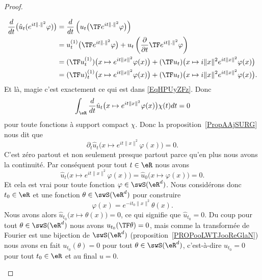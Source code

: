 \begin{proof}
\begin{subproof}
        \begin{subequations}    \label{EqCRGfbLU}
            \begin{align}
            \frac{ d }{ dt }\big( \hat u_t( e^{it\| . \|^2}\varphi) \big)&=\frac{ d }{ dt }\left( u_t\big( \TF e^{it\| . \|^2}\varphi \big) \right)\\
            &=u_t^{(1)}\big( \TF  e^{it\| . \|^2}\varphi \big)+u_t\left( \frac{ \partial  }{ \partial t }\TF e^{it\| . \|^2}\varphi \right)\\
            &=(\TF u_t^{(1)})\big( x\mapsto  e^{it\| x \|^2}\varphi(x) \big)+(\TF u_t)\big( x\mapsto i\| x \|^2 e^{it\| x \|^2}\varphi(x) \big)\\
            &=(\TF u)_t^{(1)}\big( x\mapsto  e^{it\| x \|^2}\varphi(x) \big)+(\TF u_t)\big( x\mapsto i\| x \|^2 e^{it\| x \|^2}\varphi(x) \big).
            \end{align}
        \end{subequations}
        Et là, magie c'est exactement ce qui est dans \eqref{EqHPUyZFz}. Donc
        \begin{equation}
            \int_{\eR}\frac{ d }{ dt }\hat u_t\big( x\mapsto  e^{it\| x \|^2}\varphi(x) \big)\chi(t)dt=0
        \end{equation}
        pour toute fonctions à support compact \( \chi\). Donc la proposition~\ref{PropAAjSURG} nous dit que
        \begin{equation}
            \partial_t\hat u_t\big( x\mapsto e^{it\| x \|^2}\varphi(x) \big)=0.
        \end{equation}
        C'est zéro partout et non seulement presque partout parce qu'en plus nous avons la continuité. Par conséquent pour tout \( t\in \eR\) nous avons
        \begin{equation}
            \hat u_t\big( x\mapsto e^{it\| x \|^2}\varphi(x) \big)=\hat u_0\big( x\mapsto \varphi(x)\big)=0.
        \end{equation}
        Et cela est vrai pour toute fonction \( \varphi\in\swS(\eR^d)\). Nous considérons donc \( t_0\in \eR\) et une fonction \( \theta\in\swS(\eR^d)\) pour construire
        \begin{equation}
            \varphi(x)= e^{-it_0\| x \|^2}\theta(x).
        \end{equation}
        Nous avons alors \( \hat u_{t_0}\big( x\mapsto\theta(x) \big)=0\), ce qui signifie que \( \hat u_{t_0}=0\). Du coup pour tout \( \theta\in\swS(\eR^d)\) nous avons \( u_{t_0}(\TF\theta)=0\), mais comme la transformée de Fourier est une bijection de \( \swS(\eR^d)\) (proposition~\ref{PROPooLWTJooReGlaN}) nous avons en fait \( u_{t_0}(\theta)=0\) pour tout \( \theta\in\swS(\eR^d)\), c'est-à-dire \( u_{t_0}=0\) pour tout \( t_0\in \eR\) et au final \( u=0\).
    \end{subproof}
\end{proof}
